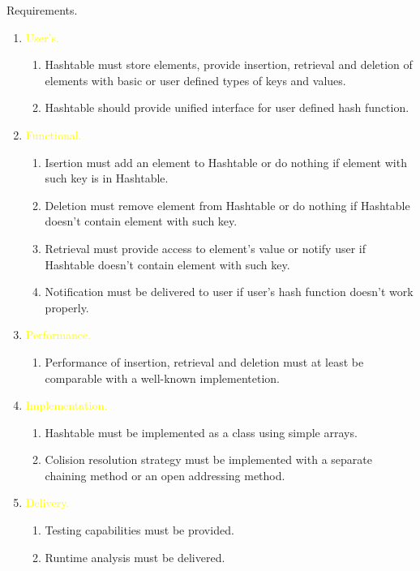 \documentclass{beamer}
\begin{document}
\begin{frame}[allowframebreaks]{Requirements.}
  \begin{enumerate}

  \item \textcolor{yellow}{User's.}
    \begin{enumerate}
    \item Hashtable must store elements, provide insertion, retrieval and deletion of elements with basic
      or user defined types of keys and values.
    \item Hashtable should provide unified interface for user defined hash function.
    \end{enumerate}

  \item \textcolor{yellow}{Functional.}
    \begin{enumerate}
    \item Isertion must add an element to Hashtable or do nothing if element with such key is in Hashtable. 
    \item Deletion must remove element from Hashtable or do nothing if Hashtable doesn't contain element with such key.
    \item Retrieval must provide access to element's value or notify user if Hashtable doesn't contain element with such key.
    \item Notification must be delivered to user if user's hash function doesn't work properly.
    \end{enumerate}
    \framebreak
  \item \textcolor{yellow}{Performance.}
    \begin{enumerate}
    \item Performance of insertion, retrieval and deletion must at least be comparable with a well-known implementetion.
    \end{enumerate}

  \item \textcolor{yellow}{Implementation.}
    \begin{enumerate}
    \item Hashtable must be implemented as a class using simple arrays.
    \item Colision resolution strategy must be implemented with a separate
      chaining method or an open addressing method.
    \end{enumerate}

  \item \textcolor{yellow}{Delivery.}
    \begin{enumerate}
    \item Testing capabilities must be provided. 
    \item Runtime analysis must be delivered.
    \end{enumerate}
  \end{enumerate}
   
\end{frame}
\end{document}
